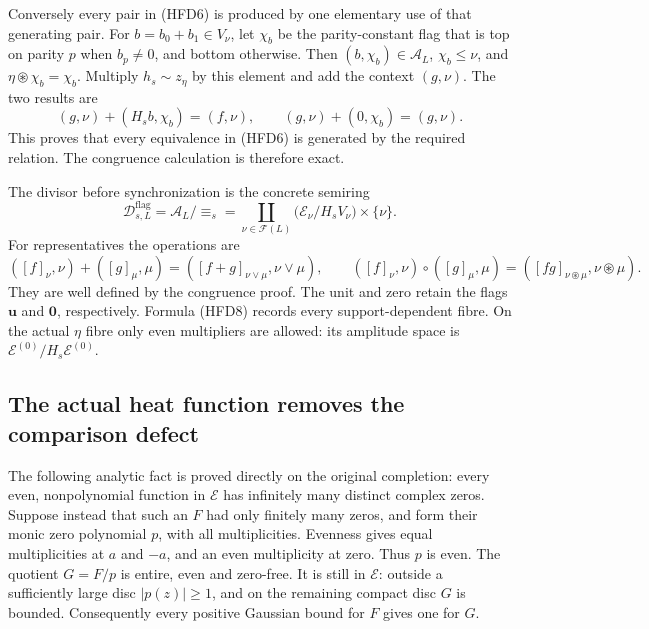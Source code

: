Conversely every pair in (HFD6) is produced by
one elementary use of that generating pair.
For $b=b_0+b_1\in V_\nu$, let $\chi_b$ be the
parity-constant flag that is top on parity $p$
when $b_p\ne0$, and bottom otherwise. Then
$(b,\chi_b)\in\mathcal A_L$,
$\chi_b\le\nu$, and
$\eta\circledast\chi_b=\chi_b$.
Multiply $h_s\sim z_\eta$ by this element and
add the context $(g,\nu)$. The two results are
\[
 (g,\nu)+(H_sb,\chi_b)=(f,\nu),\qquad
 (g,\nu)+(0,\chi_b)=(g,\nu).
\]
This proves that every equivalence in (HFD6)
is generated by the required relation. The
congruence calculation is therefore exact.

The divisor before synchronization is the concrete
semiring
\begin{equation}\tag{HFD8}
 \mathcal D^{\mathrm{flag}}_{s,L}
   =\mathcal A_L/\!\equiv_s
   =\coprod_{\nu\in\mathcal F(L)}
                \bigl(\mathcal E_\nu/H_sV_\nu\bigr)\times\{\nu\}.
\end{equation}
For representatives the operations are
\begin{equation}\tag{HFD9}
 ([f]_\nu,\nu)+([g]_\mu,\mu)
       =([f+g]_{\nu\vee\mu},\nu\vee\mu),\qquad
 ([f]_\nu,\nu)\circ([g]_\mu,\mu)
       =([fg]_{\nu\circledast\mu},\nu\circledast\mu).
\end{equation}
They are well defined by the congruence proof.
The unit and zero retain the flags $\mathbf u$
and $\mathbf0$, respectively. Formula (HFD8)
records every support-dependent fibre.
On the actual $\eta$ fibre only even multipliers
are allowed: its amplitude space is
$\mathcal E^{(0)}/H_s\mathcal E^{(0)}$.

\subsection{The actual heat function removes the comparison defect}

The following analytic fact is proved directly on
the original completion: every even, nonpolynomial
function in $\mathcal E$ has infinitely many distinct
complex zeros.
Suppose instead that such an $F$ had only finitely
many zeros, and form their monic zero polynomial $p$,
with all multiplicities. Evenness gives equal
multiplicities at $a$ and $-a$, and an even
multiplicity at zero. Thus $p$ is even.
The quotient $G=F/p$ is entire, even and zero-free.
It is still in $\mathcal E$: outside a sufficiently
large disc $|p(z)|\ge1$, and on the remaining
compact disc $G$ is bounded. Consequently every
positive Gaussian bound for $F$ gives one for $G$.

